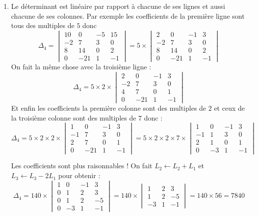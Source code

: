 \documentclass[11pt,a4paper]{article}
\begin{document}
\begin{enumerate}
  \item Le déterminant est linéaire par rapport à chacune de ses lignes
et aussi chacune de ses colonnes. 
Par exemple les coefficients de la première ligne sont tous des multiples
de $5$ donc 
$$\Delta_4 = 
\begin{vmatrix}
10 & 0 & -5 & 15 \\ -2 & 7 & 3 & 0 \\ 8 & 14 & 0 & 2 \\ 0 & -21 & 1 & -1
\end{vmatrix}
= 5 \times \begin{vmatrix}
2 & 0 & -1 & 3 \\ -2 & 7 & 3 & 0 \\ 8 & 14 & 0 & 2 \\ 0 & -21 & 1 & -1
\end{vmatrix}
$$
On fait la même chose avec la troisième ligne :
$$\Delta_4 = 5 \times 2 \times \begin{vmatrix}
2 & 0 & -1 & 3 \\ -2 & 7 & 3 & 0 \\ 4 & 7 & 0 & 1 \\ 0 & -21 & 1 & -1
\end{vmatrix}
$$
Et enfin les coefficients la première colonne sont des multiples de $2$ et 
ceux de la troisième colonne sont des multiples de $7$ donc :
$$\Delta_4 = 5 \times 2 \times 2 \times\begin{vmatrix}
1 & 0 & -1 & 3 \\ -1 & 7 & 3 & 0 \\ 2 & 7 & 0 & 1 \\ 0 & -21 & 1 & -1
\end{vmatrix}
= 5 \times 2 \times 2 \times 7  \times
\begin{vmatrix}
1 & 0 & -1 & 3 \\ -1 & 1 & 3 & 0 \\ 2 & 1 & 0 & 1 \\ 0 & -3 & 1 & -1
\end{vmatrix}
$$

Les coefficients sont plus raisonnables !
On fait $L_2\leftarrow L_2+L_1$ et $L_3\leftarrow L_3-2L_1$
pour obtenir :
$$\Delta_4 = 140 \times 
\begin{vmatrix}
1 & 0 & -1 & 3 \\ 0 & 1 & 2 & 3 \\ 0 & 1 & 2 & -5 \\ 0 & -3 & 1 & -1
\end{vmatrix}
=140 \times \begin{vmatrix}
 1 & 2 & 3 \\  1 & 2 & -5 \\ -3 & 1 & -1
\end{vmatrix}
= 140 \times 56 = 7840$$



\end{enumerate}
\end{document}
